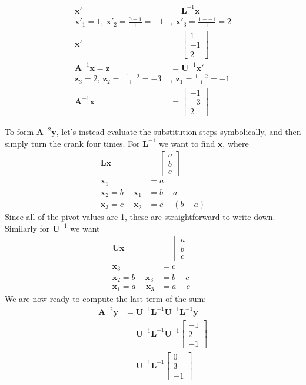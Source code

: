 \documentclass[]{article}
\newcommand{\A}{\bm{A}}					%
\newcommand{\bbm}{\begin{bmatrix}}		%
\newcommand{\ebm}{\end{bmatrix}}		%
\newcommand{\x}{\bm{x}}					%
\newcommand{\y}{\bm{y}}					%
\newcommand{\z}{\bm{z}}					%
\begin{document}
\begin{enumerate}
      \[\begin{split}
      \x' & = \bm{L}^{-1}\x \\
      \x'_1 = 1, ~ \x'_2 = \frac{0 - 1}{1} = -1&, ~ \x'_3 = \frac{1 - -1}{1} = 2 \\
      \x' & = \bbm 1 \\ -1 \\ 2 \ebm \\
      \A^{-1}\x = \z & = \bm{U}^{-1}\x' \\
      \z_3 = 2, ~ \z_2 = \frac{-1 -2}{1} = -3&, ~ \z_1 = \frac{1 - 2}{1} = -1 \\
      \A^{-1}\x &= \bbm -1 \\ -3 \\ 2 \ebm
      \end{split}\]

      To form $\A^{-2}\y$, let's instead evaluate the substitution
      steps symbolically, and then simply turn the crank four
      times. For $\bm{L}^{-1}$ we want to find $\x$, where
      \[\begin{split}
        \bm{Lx} &= \bbm a\\b\\c \ebm \\
        \x_1 &= a \\
        \x_2 = b - \x_1 &= b - a \\
        \x_3 = c - \x_2 &= c - (b - a)
      \end{split}\]
      Since all of the pivot values are 1, these are straightforward
      to write down. Similarly for $\bm{U}^{-1}$ we want
      \[\begin{split}
        \bm{Ux} &= \bbm a\\b\\c \ebm \\
        \x_3 &= c \\
        \x_2 = b - \x_3 &= b - c \\
        \x_1 = a - \x_3 &= a - c
      \end{split}\]
      We are now ready to compute the last term of the sum:
      \[\begin{split}
      \A^{-2}\y &= \bm{U}^{-1}\bm{L}^{-1}\bm{U}^{-1}\bm{L}^{-1}\y \\
      &= \bm{U}^{-1}\bm{L}^{-1}\bm{U}^{-1}\bbm -1\\2\\-1 \ebm \\
      &= \bm{U}^{-1}\bm{L}^{-1}\bbm 0\\3\\-1 \ebm \\

\end{split}\]
\end{enumerate}
\end{document}

